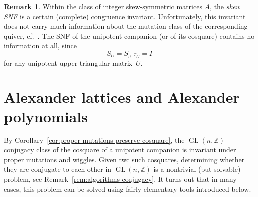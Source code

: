 \documentclass[11pt, letterpaper]{amsart}
\theoremstyle{definition}
\newtheorem{remark}[theorem]{Remark}
\numberwithin{equation}{section}
\def\ZZ{{\mathbb Z}}
\def\GL{{\operatorname{GL}}}
\begin{document}
{\begin{remark}
Within the class of integer skew-symmetric matrices $A$, the \emph{skew SNF} \cite[Section~IV.3]{NewmanMatrices}
is a certain (complete) congruence invariant.
Unfortunately, this invariant %
does not carry much information about the mutation class of the corresponding quiver, cf.\ \cite[Remark~2.8.5]{fwz1-3}.
The SNF of the unipotent companion (or of its cosquare) contains no information at all, since 
\begin{equation*}
S_U = S_{U^{-T} U} = I
\end{equation*}
for any unipotent upper triangular matrix~$U$. 
\end{remark}
} %

\section{Alexander lattices and Alexander polynomials  
}
\label{sec:alexander-polynomials}

By Corollary~\ref{cor:proper-mutations-preserve-cosquare},
the $\GL(n,\ZZ)$ conjugacy class of the cosquare of a unipotent companion
is invariant under proper mutations and wiggles. 
%
Given two such cosquares, determining whether they are conjugate to each other in $\GL(n,\ZZ)$ 
is a nontrivial (but solvable) problem, see Remark~\ref{rem:algorithms-conjugacy}. 
It turns out that in many cases, this problem can be solved using fairly elementary tools introduced below. 
\end{document}
